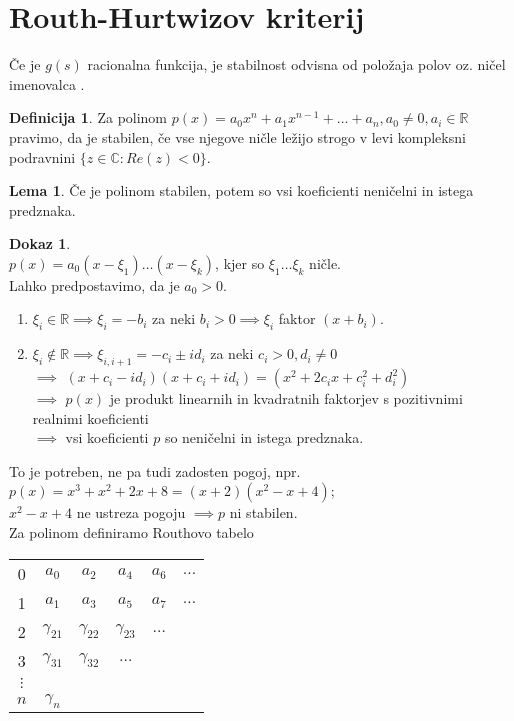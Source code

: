\documentclass[a4paper, 12pt]{book}
\theoremstyle{definition}
\newtheorem{defn}[counter]{Definicija}
\newtheorem{lemma}[counter]{Lema}
\newtheorem{pro}[counter]{Dokaz}
\theoremstyle{remark}
\newcommand{\R}{\mathbb{R}}
\newcommand{\C}{\mathbb{C}}
\begin{document}
\section{Routh-Hurtwizov kriterij}

Če je $g(s)$ racionalna funkcija,
je stabilnost odvisna od položaja polov oz. ničel imenovalca .
\begin{defn}
  Za polinom $p(x) = a_0 x^n + a_1 x^{n-1} + \dots + a_n, a_0 \neq 0, a_i \in \R$ pravimo,
  da je stabilen, če vse njegove ničle ležijo strogo v levi kompleksni podravnini
  $\{z \in \C: Re(z) < 0\}$.
\end{defn}
\begin{lemma}
  Če je polinom  stabilen,
  potem so vsi koeficienti neničelni in istega predznaka.
\end{lemma}
\begin{pro} \text{} \\
  $p(x) = a_0 (x-\xi_1) \dots (x-\xi_k)$, kjer so $\xi_1 \dots \xi_k$ ničle. \\
  Lahko predpostavimo, da je $a_0 > 0$.
  \begin{enumerate}[label=\alph*)]
      \item $\xi_i \in \R \implies \xi_i = -b_i$ za neki $b_i > 0 \implies \xi_i$
           faktor $(x+b_i)$.
      \item $\xi_i \notin \R \implies \xi_{i,i+1} = -c_i \pm i d_i$ za neki
          $c_i > 0, d_i \neq 0$ \\
          $\implies$  $(x+c_i-id_i) (x+c_i+id_i) = (x^2 + 2c_ix + c_i^2+d_i^2)$ \\
          $\implies$ $p(x)$ je produkt linearnih in kvadratnih faktorjev
          s pozitivnimi realnimi koeficienti \\
          $\implies$ vsi koeficienti $p$ so neničelni in istega predznaka.
  \end{enumerate}
\end{pro}
To je potreben, ne pa tudi zadosten pogoj, npr. \\
$p(x) = x^3 + x^2 + 2x + 8 = (x+2) (x^2-x+4)$; \\
$x^2-x+4$ ne ustreza pogoju $\implies p$ ni stabilen. \\
Za polinom  definiramo Routhovo tabelo
\begin{center}
  \begin{tabular}{c | c c c c c}
       & & & & & \\
      \hline
      0 & $a_0$ & $a_2$ & $a_4$ & $a_6$ & $\dots$ \\
      1 & $a_1$ & $a_3$ & $a_5$ & $a_7$ & $\dots$ \\
      2 & $\gamma_{21}$ & $\gamma_{22}$ & $\gamma_{23}$ & $\dots$ & \\
      3 & $\gamma_{31}$ & $\gamma_{32}$ & $\dots$ & & \\
      $\vdots$ & & & & & \\
      $n$ & $\gamma_n$
  \end{tabular}
\end{center}
\end{document}
